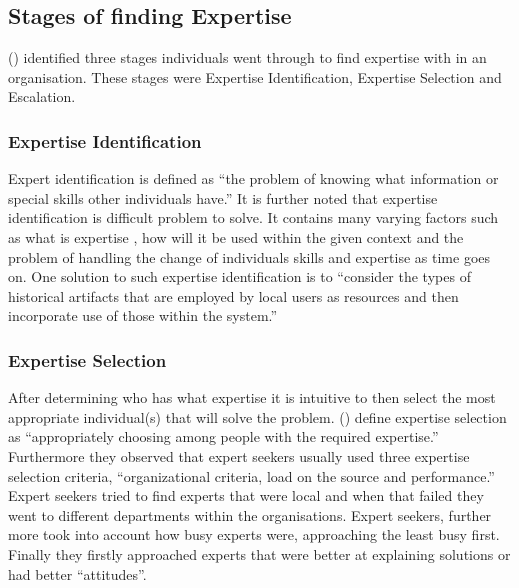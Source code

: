 \documentclass[a4paper,oneside,11pt]{report}
\begin{document}
\subsection{Stages of finding Expertise}	
\citeauthor{mcdonalackerman1998}(\citeyear{mcdonalackerman1998}) identified three stages individuals went through to find expertise with in an organisation. These stages were Expertise Identification, Expertise Selection and Escalation.  
\subsubsection{Expertise Identification} 
Expert identification is defined as \enquote {the problem of knowing what information or special skills other individuals have.} It is further noted that expertise identification is difficult problem to solve. It contains many varying factors such as what is expertise , how will it be used within the given context and the problem of handling the change of individuals skills and expertise as time goes on. One solution to such expertise identification is to \enquote {consider the types of historical artifacts that are employed by local users as resources and then incorporate use of those within the system.}      \autocite{mcdonalackerman1998}
\subsubsection{Expertise Selection} 
After determining who has what expertise it is intuitive to then select the most appropriate individual(s) that will solve the problem. \citeauthor{mcdonalackerman1998}(\citeyear{mcdonalackerman1998}) define expertise selection as \enquote {appropriately choosing among people with the required expertise.} Furthermore they observed that expert seekers usually used three expertise selection criteria, \enquote {organizational criteria, load on the source and performance.} Expert seekers tried to find experts that were local and when that failed they went to different departments within the organisations. Expert seekers, further more took into account how busy experts were, approaching the least busy first. Finally they firstly approached experts that were better at explaining solutions or had better \enquote {attitudes}.
\end{document}
